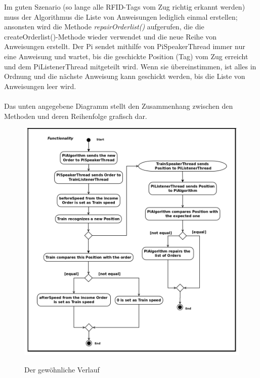 Im guten Szenario (so lange alle RFID-Tags vom Zug richtig erkannt werden) muss der Algorithmus die Liste von Anweisungen lediglich einmal erstellen; ansonsten wird die Methode \textit{repairOrderlist()} aufgerufen, die die createOrderlist()-Methode wieder verwendet und die neue Reihe von Anweisungen erstellt. Der Pi sendet mithilfe von PiSpeakerThread immer nur eine Anweisung und wartet, bis die geschickte Position (Tag) vom Zug erreicht und dem PiListenerThread mitgeteilt wird. Wenn sie übereinstimmen, ist alles in Ordnung und die nächste Anweisung kann geschickt werden, bis die Liste von Anweisungen leer wird.\\
\\
Das unten angegebene Diagramm stellt den Zusammenhang zwischen den Methoden und deren Reihenfolge grafisch dar. \\
\begin{figure}[H]	
\caption{Der gewöhnliche Verlauf}
\includegraphics[width=2\textwidth, width=470pt]{content/images/Act-dia2.png}
\label{pic:init}
\end{figure}

